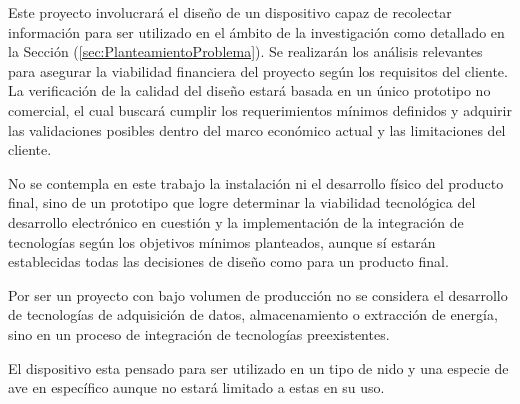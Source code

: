 Este proyecto involucrará el diseño de un dispositivo capaz de recolectar información para ser utilizado en el ámbito de la investigación como detallado en la Sección (\ref{sec:PlanteamientoProblema}). Se realizarán los análisis relevantes para asegurar la viabilidad financiera del proyecto según los requisitos del cliente. La verificación de la calidad del diseño estará basada en un único prototipo no comercial, el cual buscará cumplir los requerimientos mínimos definidos y adquirir las validaciones posibles dentro del marco económico actual y las limitaciones del cliente. 

No se contempla en este trabajo la instalación ni el desarrollo físico del producto final, sino de un prototipo que logre determinar la viabilidad tecnológica del desarrollo electrónico en cuestión y la implementación de la integración de tecnologías según los objetivos mínimos planteados, aunque sí estarán establecidas todas las decisiones de diseño como para un producto final. 

Por ser un proyecto con bajo volumen de producción no se considera el desarrollo de tecnologías de adquisición de datos, almacenamiento o extracción de energía, sino en un proceso de integración de tecnologías preexistentes.

El dispositivo esta pensado para ser utilizado en un tipo de nido y una especie de ave en específico aunque no estará limitado a estas en su uso.
